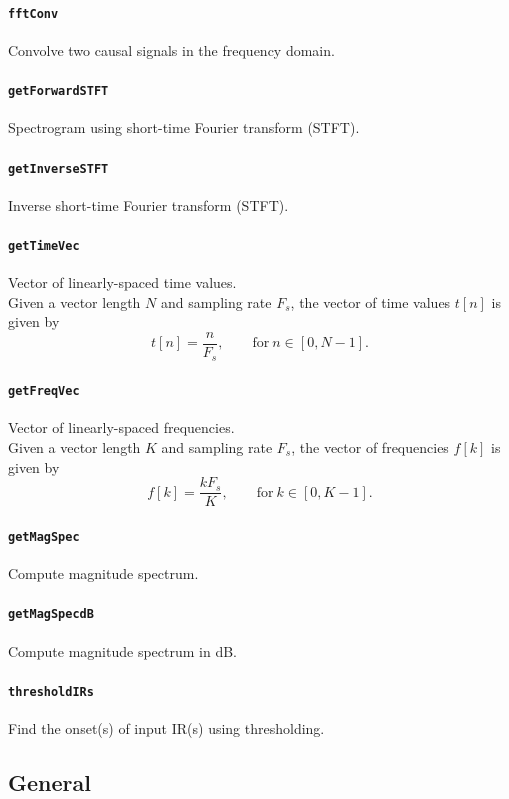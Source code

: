 \documentclass[11pt, oneside]{article}
\newcommand{\function}[1]{\paragraph*{\texttt{#1}}}
\begin{document}
\function{fftConv} Convolve two causal signals in the frequency domain. \\

\function{getForwardSTFT} Spectrogram using short-time Fourier transform (STFT). \\

\function{getInverseSTFT} Inverse short-time Fourier transform (STFT). \\

\function{getTimeVec} Vector of linearly-spaced time values. \\
Given a vector length $N$ and sampling rate $F_s$, the vector of time values $t[n]$ is given by
\begin{equation}
t[n] = \frac{n}{F_s}, \quad\quad \text{for} ~ n \in [0, N-1].
\end{equation}

\function{getFreqVec} Vector of linearly-spaced frequencies. \\
Given a vector length $K$ and sampling rate $F_s$, the vector of frequencies $f[k]$ is given by
\begin{equation}
f[k] = \frac{k F_s}{K}, \quad\quad \text{for} ~ k \in [0, K-1].
\end{equation}

\function{getMagSpec} Compute magnitude spectrum. \\

\function{getMagSpecdB} Compute magnitude spectrum in dB. \\

\function{thresholdIRs} Find the onset(s) of input IR(s) using thresholding. \\


%

\subsection{General}
\end{document}
